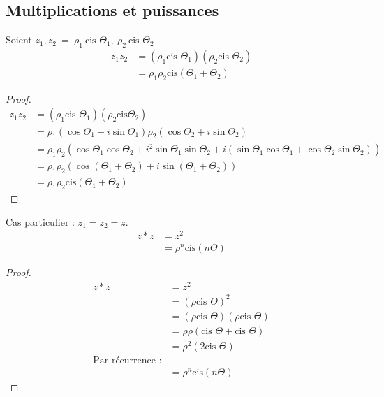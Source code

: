 \documentclass[]{article}
\newcommand{\cis}{\text{cis }}
\newcommand{\cisns}{\text{cis}}
\begin{document}
\subsection{Multiplications et puissances}
\noindent
Soient $z_1, z_2 \ = \ \rho_1 \ \cis{\Theta_1}, \ \rho_2 \ \cis{\Theta_2}$
\begin{align*}
z_1 z_2 &= (\rho_1\cis\Theta_1)(\rho_2\cis{\Theta_2})
\\ &= \rho_1\rho_2\cisns{(\Theta_1+\Theta_2)}
\end{align*}
\begin{proof}
\begin{align*}
z_1 z_2 &= (\rho_1\cis\Theta_1)(\rho_2\text{cis}\Theta_2)
\\ &= \rho_1(\cos{\Theta_1}+i\sin{\Theta_1})\rho_2(\cos{\Theta_2}+i\sin{\Theta_2})
\\ &= \rho_1\rho_2(\cos{\Theta_1}\cos{\Theta_2}+i^2\sin{\Theta_1}\sin{\Theta_2}+i(\sin{\Theta_1}\cos{\Theta_1}+\cos{\Theta_2}\sin{\Theta_2}))
\\ &= \rho_1\rho_2(\cos{(\Theta_1+\Theta_2)}+i\sin{(\Theta_1+\Theta_2)})
\\ &= \rho_1\rho_2\cisns{(\Theta_1+\Theta_2)}
\end{align*}
\end{proof}
\noindent
Cas particulier : $z_1 = z_2 = z$.
\begin{align*}
z*z &= z^2
\\  &= \rho^n\cisns{(n\Theta)}
\end{align*}
\begin{proof}
\begin{align*}
z*z &= z^2
\\  &= (\rho\cis{\Theta})^2
\\  &= (\rho\cis{\Theta})(\rho\cis{\Theta})
\\  &= \rho\rho(\cis{\Theta}+\cis{\Theta})
\\  &= \rho^2(2\cis{\Theta})
\\  \text{Par récurrence :}
\\  &= \rho^n\cisns{(n\Theta)}
\end{align*}
\end{proof}
\end{document}
